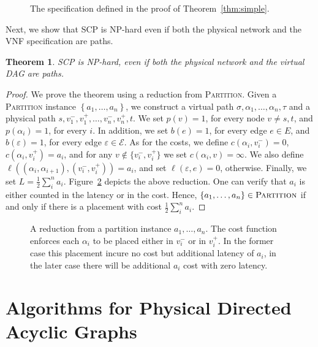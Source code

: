 \documentclass[11pt]{article}
\newtheorem{theorem}{Theorem}
\newcommand{\set}[1]{\left\{ #1 \right\}}
\newcommand{\half}{\frac{1}{2}}
\newcommand{\eps}{\varepsilon}
\newcommand{\scp}{\textsc{SCP}\xspace}
\newcommand{\calE}{\mathcal{E}}
\begin{document}
\begin{figure}[t]
  \centering
\scalebox{1}{
  
}
\caption{The specification defined in the proof of Theorem~\ref{thm:simple}.}
\label{fig:simple}
\end{figure}

Next, we show that \scp is NP-hard even if both the physical network
and the VNF specification are paths.

\begin{theorem}
\scp is NP-hard, even if both the physical network and the virtual DAG
are paths.
\end{theorem}
\begin{proof}
We prove the theorem using a reduction from \textsc{Partition}.  Given
a \textsc{Partition} instance $\set{a_1, \ldots, a_n}$, we construct a
virtual path $\sigma, \alpha_1, \ldots, \alpha_n, \tau$ and a physical
path $s, v_1^-, v_1^+, \ldots, v_n^-, v_n^+, t$.  We set $p(v) = 1$,
for every node $v \neq s,t$, and $p(\alpha_i) = 1$, for every $i$.  In
addition, we set $b(e) = 1$, for every edge $e \in E$, and $b(\eps) =
1$, for every edge $\eps \in \calE$.
%
As for the costs, we define $c(\alpha_i, v_i^-) = 0$, $c(\alpha_i,
v_i^+) = a_i$, and for any $v \notin \{v_i^-,v_i^+\}$ we set
$c(\alpha_i, v) = \infty$.  We also define $\ell((\alpha_i,\alpha_{i+1}),
(v_i^-,v_i^+)) = a_i$, and set $\ell(\eps,e) = 0$, otherwise.  Finally,
we set $L = \half \sum_i^n a_i$.
%
Figure~\ref{fig:reduction2} depicts the above reduction.
%
One can verify that $a_i$ is either counted in the latency or in the
cost.  Hence, $\set{a_1, \ldots, a_n} \in \textsc{Partition}$ if and
only if there is a placement with cost $\half \sum_i^n a_i$.
\end{proof}


\begin{figure}[t]
\centering
\scalebox{.75}{

}
\caption{A reduction from a partition instance $a_1, \ldots, a_n$.
  The cost function enforces each $\alpha_i$ to be placed either in
  $v_i^-$ or in $v_i^+$.  In the former case this placement incure no
  cost but additional latency of $a_i$, in the later case there will
  be additional $a_i$ cost with zero latency.}
\label{fig:reduction2}
\end{figure}



\section{Algorithms for Physical Directed Acyclic Graphs}
\label{sec:algorithms}
\end{document}
